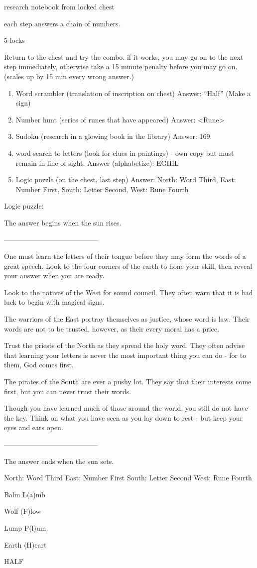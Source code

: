 \documentclass[green]{NeptuneBall}
\begin{document}
\name{\gGlowShell{}}

research notebook from locked chest

each step answers a chain of numbers.

5 locks

Return to the chest and try the combo. if it works, you may go on to the next step immediately, otherwise take a 15 minute penalty before you may go on. (scales up by 15 min every wrong answer.)

\begin{enumerate}
\item Word scrambler  (translation of inscription on chest) Answer: ``Half'' (Make a sign)
\item Number hunt  (series of runes that have appeared) Answer: <Rune>
\item Sudoku  (research in a glowing book in the library) Answer: 169
\item word search to letters  (look for clues in paintings) - own copy but must remain in line of sight. Answer (alphabetize): EGHIL
\item Logic puzzle  (on the chest, last step) Answer: North: Word Third, East: Number First, South: Letter Second, West: Rune Fourth
\end{enumerate}


Logic puzzle:

The answer begins when the sun rises. 

-----------------------------------------

One must learn the letters of their tongue before they may form the words of a great speech. Look to the four corners of the earth to hone your skill, then reveal your answer when you are ready.

Look to the natives of the West for sound council. They often warn that it is bad luck to begin with magical signs.

The warriors of the East portray themselves as justice, whose word is law. Their words are not to be trusted, however, as their every moral has a price.

Trust the priests of the North as they spread the holy word. They often advise that learning your letters is never the most important thing you can do - for to them, God comes first.

The pirates of the South are ever a pushy lot. They say that their interests come first, but you can never trust their words.

Though you have learned much of those around the world, you still do not have the key. Think on what you have seen as you lay down to rest - but keep your eyes and ears open.

-----------------------------------------

The answer ends when the sun sets.




North: Word Third
East: Number First
South: Letter Second
West: Rune Fourth



Balm
L(a)mb

Wolf
(F)low

Lump
P(l)um

Earth
(H)eart

HALF
\end{document}

